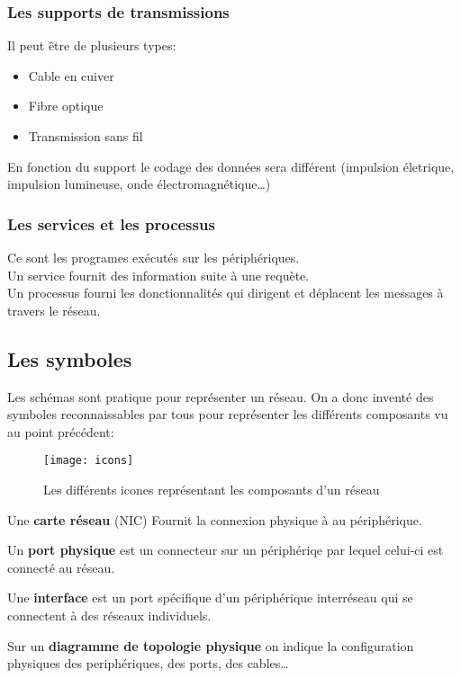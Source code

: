 \documentclass[10pt,a4paper]{article}
\begin{document}
 \subsubsection{Les supports de transmissions}
 Il peut être de plusieurs types:
 \begin{itemize}
	 \item Cable en cuiver
	 \item Fibre optique
	 \item Transmission sans fil
 \end{itemize}
 En fonction du support le codage des données sera différent (impulsion életrique, impulsion lumineuse, onde électromagnétique\ldots)

 \subsubsection{Les services et les processus}
 Ce sont les programes exécutés sur les périphériques.\\
 \indent
 Un service fournit des information suite à une requète.\\
 \indent
 Un processus fourni les donctionnalités qui dirigent et déplacent les messages à travers le réseau.

 \subsection{Les symboles}
 Les schémas sont pratique pour représenter un réseau. On a donc inventé des symboles reconnaissables par tous pour représenter les différents composants vu au point précédent:
 \begin{figure}[h]
	 \centering
	 \texttt{[image: icons]}
	 \caption{Les différents icones représentant les composants d'un réseau}
 \end{figure}

 \smallskip
 \indent
 Une \textbf{carte réseau} (NIC) Fournit la connexion physique à au périphérique.

 \smallskip
 \indent
 Un \textbf{port physique} est un connecteur sur un périphériqe par lequel celui-ci est connecté au réseau.

 \smallskip
 \indent
 Une \textbf{interface} est un port spécifique d'un périphérique interréseau qui se connectent à des réseaux individuels.

 \medskip
 \indent
 Sur un \textbf{diagramme de topologie physique} on indique la configuration physiques des periphériques, des ports, des cables\ldots
\end{document}
